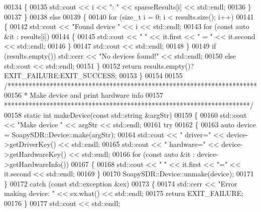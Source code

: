 \begin{DoxyCode}
00134         \{
00135             std::cout << i << \textcolor{stringliteral}{": "} << sparseResults[i] << std::endl;
00136         \}
00137     \}
00138     \textcolor{keywordflow}{else}
00139     \{
00140         \textcolor{keywordflow}{for} (\textcolor{keywordtype}{size\_t} i = 0; i < results.size(); i++)
00141         \{
00142             std::cout << \textcolor{stringliteral}{"Found device "} << i << std::endl;
00143             \textcolor{keywordflow}{for} (\textcolor{keyword}{const} \textcolor{keyword}{auto} &it : results[i])
00144             \{
00145                 std::cout << \textcolor{stringliteral}{"  "} << it.first << \textcolor{stringliteral}{" = "} << it.second << std::endl;
00146             \}
00147             std::cout << std::endl;
00148         \}
00149         \textcolor{keywordflow}{if} (results.empty()) std::cerr << \textcolor{stringliteral}{"No devices found!"} << std::endl;
00150         \textcolor{keywordflow}{else} std::cout << std::endl;
00151     \}
00152     \textcolor{keywordflow}{return} results.empty()?EXIT\_FAILURE:EXIT\_SUCCESS;
00153 \}
00154 
00155 \textcolor{comment}{/***********************************************************************}
00156 \textcolor{comment}{ * Make device and print hardware info}
00157 \textcolor{comment}{ **********************************************************************/}
00158 \textcolor{keyword}{static} \textcolor{keywordtype}{int} makeDevice(\textcolor{keyword}{const} std::string &argStr)
00159 \{
00160     std::cout << \textcolor{stringliteral}{"Make device "} << argStr << std::endl;
00161     \textcolor{keywordflow}{try}
00162     \{
00163         \textcolor{keyword}{auto} device = SoapySDR::Device::make(argStr);
00164         std::cout << \textcolor{stringliteral}{"  driver="} << device->getDriverKey() << std::endl;
00165         std::cout << \textcolor{stringliteral}{"  hardware="} << device->getHardwareKey() << std::endl;
00166         \textcolor{keywordflow}{for} (\textcolor{keyword}{const} \textcolor{keyword}{auto} &it : device->getHardwareInfo())
00167         \{
00168             std::cout << \textcolor{stringliteral}{"  "} << it.first << \textcolor{stringliteral}{"="} << it.second << std::endl;
00169         \}
00170         SoapySDR::Device::unmake(device);
00171     \}
00172     \textcolor{keywordflow}{catch} (\textcolor{keyword}{const} std::exception &ex)
00173     \{
00174         std::cerr << \textcolor{stringliteral}{"Error making device: "} << ex.what() << std::endl;
00175         \textcolor{keywordflow}{return} EXIT\_FAILURE;
00176     \}
00177     std::cout << std::endl;

\end{DoxyCode}
